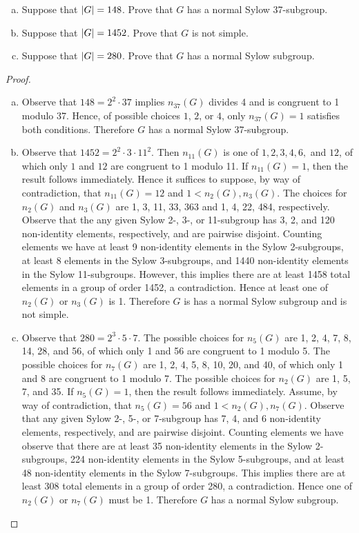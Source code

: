 \documentclass[10pt]{amsart}
\begin{document}
\begin{thm}
  \begin{enumerate}[(a)]
    \item
      Suppose that $\left| G \right| = 148$.  Prove that $G$ has a normal Sylow 37-subgroup.
    \item
      Suppose that $\left| G \right| = 1452$.  Prove that $G$ is not simple.
    \item
      Suppose that $\left| G \right| = 280$.  Prove that $G$ has a normal Sylow subgroup.
  \end{enumerate}
  \begin{proof}
    \begin{enumerate}[(a)]
    \item
      Observe that $148 = 2^2\cdot37$ implies $n_{37}(G)$ divides 4 and is congruent to 1 modulo 37.
      Hence, of possible choices $1$, $2$, or $4$, only $n_{37}(G) = 1$ satisfies both conditions.
      Therefore $G$ has a normal Sylow 37-subgroup.
    \item
      Observe that $1452 = 2^2\cdot3\cdot11^2$.
      Then $n_{11}(G)$ is one of $1, 2,3,4,6,$ and $12$, of which only $1$ and $12$ are congruent to 1 modulo 11.
      If $n_{11}(G) = 1$, then the result follows immediately.  
      Hence it suffices to suppose, by way of contradiction, that $n_{11}(G) = 12$ and $1 < n_2(G), n_3(G)$.
      The choices for $n_2(G)$ and $n_3(G)$ are 1, 3, 11, 33, 363 and 1, 4, 22, 484, respectively.
      Observe that the any given Sylow 2-, 3-, or 11-subgroup has 3, 2, and 120 non-identity elements, respectively, and are pairwise disjoint.
      Counting elements we have at least 9 non-identity elements in the Sylow 2-subgroups, at least 8 elements in the Sylow 3-subgroups, and 1440 non-identity elements in the Sylow 11-subgroups.
      However, this implies there are at least 1458 total elements in a group of order 1452, a contradiction.
      Hence at least one of $n_2(G)$ or $n_3(G)$ is 1.
      Therefore $G$ is has a normal Sylow subgroup and is not simple.
    \item
      Observe that $280 = 2^3\cdot5\cdot7$.
      The possible choices for $n_5(G)$ are 1, 2, 4, 7, 8, 14, 28, and 56, of which only 1 and 56 are congruent to 1 modulo 5.
      The possible choices for $n_7(G)$ are 1, 2, 4, 5, 8, 10, 20, and 40, of which only 1 and 8 are congruent to 1 modulo 7.
      The possible choices for $n_2(G)$ are 1, 5, 7, and 35.
      If $n_5(G) = 1$, then the result follows immediately.
      Assume, by way of contradiction, that $n_5(G) = 56$ and $1 < n_2(G), n_7(G)$.
      Observe that any given Sylow 2-, 5-, or 7-subgroup has 7, 4, and 6 non-identity elements, respectively, and are pairwise disjoint.
      Counting elements we have observe that there are at least 35 non-identity elements in the Sylow 2-subgroups, 224 non-identity elements in the Sylow 5-subgroups, and at least 48 non-identity elements in the Sylow 7-subgroups.
      This implies there are at least 308 total elements in a group of order 280, a contradiction.
      Hence one of $n_2(G)$ or $n_7(G)$ must be 1.
      Therefore $G$ has a normal Sylow subgroup.
    \end{enumerate}
  \end{proof}
\end{thm}
\end{document}
